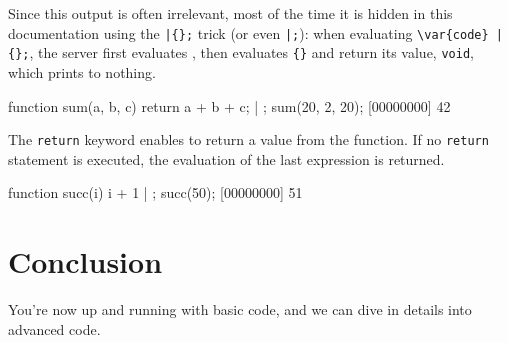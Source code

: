 Since this output is often irrelevant, most of the time it is hidden
in this documentation using the \lstinline'|{};' trick (or even
\lstinline'|;'): when evaluating \lstinline'\var{code} | {};', the
server first evaluates , then evaluates \lstinline'{}' and
return its value, \lstinline'void', which prints to nothing.

\begin{urbiscript}[firstnumber=last]
function sum(a, b, c)
{
  return a + b + c;
} | {};
sum(20, 2, 20);
[00000000] 42
\end{urbiscript}

The \lstinline{return} keyword enables to return a value from the
function. If no \lstinline{return} statement is executed, the
evaluation of the last expression is returned.

\begin{urbiscript}[firstnumber=last]
function succ(i) { i + 1 } | {};
succ(50);
[00000000] 51
\end{urbiscript}

\section{Conclusion}

You're now up and running with basic \us code, and we can dive in
details into advanced \us code.

